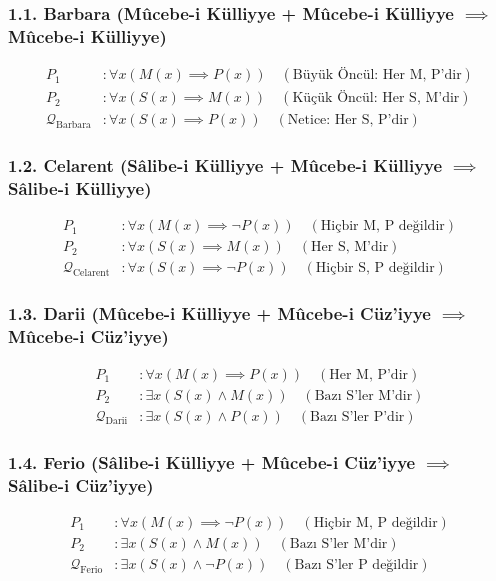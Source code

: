 \documentclass[11pt, a4paper]{article}
\begin{document}
\subsubsection{1.1. Barbara (Mûcebe-i Külliyye + Mûcebe-i Külliyye $\implies$ Mûcebe-i Külliyye)}
\begin{align}
P_1 &: \forall x (M(x) \implies P(x)) \quad (\text{Büyük Öncül: Her M, P'dir}) \\
P_2 &: \forall x (S(x) \implies M(x)) \quad (\text{Küçük Öncül: Her S, M'dir}) \\
\mathcal{Q}_{\text{Barbara}} &: \forall x (S(x) \implies P(x)) \quad (\text{Netice: Her S, P'dir})
\end{align}

\subsubsection{1.2. Celarent (Sâlibe-i Külliyye + Mûcebe-i Külliyye $\implies$ Sâlibe-i Külliyye)}
\begin{align}
P_1 &: \forall x (M(x) \implies \neg P(x)) \quad (\text{Hiçbir M, P değildir}) \\
P_2 &: \forall x (S(x) \implies M(x)) \quad (\text{Her S, M'dir}) \\
\mathcal{Q}_{\text{Celarent}} &: \forall x (S(x) \implies \neg P(x)) \quad (\text{Hiçbir S, P değildir})
\end{align}

\subsubsection{1.3. Darii (Mûcebe-i Külliyye + Mûcebe-i Cüz'iyye $\implies$ Mûcebe-i Cüz'iyye)}
\begin{align}
P_1 &: \forall x (M(x) \implies P(x)) \quad (\text{Her M, P'dir}) \\
P_2 &: \exists x (S(x) \land M(x)) \quad (\text{Bazı S'ler M'dir}) \\
\mathcal{Q}_{\text{Darii}} &: \exists x (S(x) \land P(x)) \quad (\text{Bazı S'ler P'dir})
\end{align}

\subsubsection{1.4. Ferio (Sâlibe-i Külliyye + Mûcebe-i Cüz'iyye $\implies$ Sâlibe-i Cüz'iyye)}
\begin{align}
P_1 &: \forall x (M(x) \implies \neg P(x)) \quad (\text{Hiçbir M, P değildir}) \\
P_2 &: \exists x (S(x) \land M(x)) \quad (\text{Bazı S'ler M'dir}) \\
\mathcal{Q}_{\text{Ferio}} &: \exists x (S(x) \land \neg P(x)) \quad (\text{Bazı S'ler P değildir})
\end{align}
\end{document}
